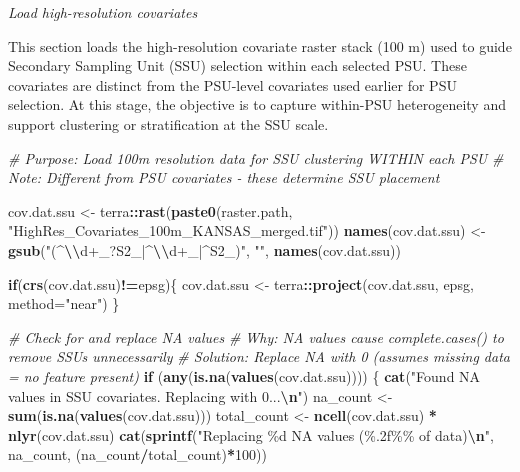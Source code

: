 \documentclass[
  10pt,
  b5paper,
  oneside]{book}
\newenvironment{Shaded}{\begin{snugshade}}{\end{snugshade}}
\newcommand{\AttributeTok}[1]{\textcolor[rgb]{0.13,0.29,0.53}{#1}}
\newcommand{\CommentTok}[1]{\textcolor[rgb]{0.56,0.35,0.01}{\textit{#1}}}
\newcommand{\ControlFlowTok}[1]{\textcolor[rgb]{0.13,0.29,0.53}{\textbf{#1}}}
\newcommand{\DecValTok}[1]{\textcolor[rgb]{0.00,0.00,0.81}{#1}}
\newcommand{\FunctionTok}[1]{\textcolor[rgb]{0.13,0.29,0.53}{\textbf{#1}}}
\newcommand{\NormalTok}[1]{#1}
\newcommand{\OtherTok}[1]{\textcolor[rgb]{0.56,0.35,0.01}{#1}}
\newcommand{\SpecialCharTok}[1]{\textcolor[rgb]{0.81,0.36,0.00}{\textbf{#1}}}
\newcommand{\StringTok}[1]{\textcolor[rgb]{0.31,0.60,0.02}{#1}}
\begin{document}
\emph{Load high-resolution covariates}

This section loads the high-resolution covariate raster stack (100 m) used to guide Secondary Sampling Unit (SSU) selection within each selected PSU. These covariates are distinct from the PSU-level covariates used earlier for PSU selection. At this stage, the objective is to capture within-PSU heterogeneity and support clustering or stratification at the SSU scale.

\begin{Shaded}
\begin{Highlighting}[]
\CommentTok{\# Purpose: Load 100m resolution data for SSU clustering WITHIN each PSU}
\CommentTok{\# Note: Different from PSU covariates {-} these determine SSU placement}

\NormalTok{cov.dat.ssu }\OtherTok{\textless{}{-}}\NormalTok{ terra}\SpecialCharTok{::}\FunctionTok{rast}\NormalTok{(}\FunctionTok{paste0}\NormalTok{(raster.path, }\StringTok{"HighRes\_Covariates\_100m\_KANSAS\_merged.tif"}\NormalTok{))}
\FunctionTok{names}\NormalTok{(cov.dat.ssu) }\OtherTok{\textless{}{-}} \FunctionTok{gsub}\NormalTok{(}\StringTok{"(\^{}}\SpecialCharTok{\textbackslash{}\textbackslash{}}\StringTok{d+\_?S2\_|\^{}}\SpecialCharTok{\textbackslash{}\textbackslash{}}\StringTok{d+\_|\^{}S2\_)"}\NormalTok{, }\StringTok{""}\NormalTok{, }\FunctionTok{names}\NormalTok{(cov.dat.ssu))}

\ControlFlowTok{if}\NormalTok{(}\FunctionTok{crs}\NormalTok{(cov.dat.ssu)}\SpecialCharTok{!=}\NormalTok{epsg)\{}
\NormalTok{  cov.dat.ssu }\OtherTok{\textless{}{-}}\NormalTok{ terra}\SpecialCharTok{::}\FunctionTok{project}\NormalTok{(cov.dat.ssu, epsg, }\AttributeTok{method=}\StringTok{"near"}\NormalTok{)}
\NormalTok{\}}

\CommentTok{\# Check for and replace NA values}
\CommentTok{\# Why: NA values cause complete.cases() to remove SSUs unnecessarily}
\CommentTok{\# Solution: Replace NA with 0 (assumes missing data = no feature present)}
\ControlFlowTok{if}\NormalTok{ (}\FunctionTok{any}\NormalTok{(}\FunctionTok{is.na}\NormalTok{(}\FunctionTok{values}\NormalTok{(cov.dat.ssu)))) \{}
  \FunctionTok{cat}\NormalTok{(}\StringTok{"Found NA values in SSU covariates. Replacing with 0...}\SpecialCharTok{\textbackslash{}n}\StringTok{"}\NormalTok{)}
\NormalTok{  na\_count }\OtherTok{\textless{}{-}} \FunctionTok{sum}\NormalTok{(}\FunctionTok{is.na}\NormalTok{(}\FunctionTok{values}\NormalTok{(cov.dat.ssu)))}
\NormalTok{  total\_count }\OtherTok{\textless{}{-}} \FunctionTok{ncell}\NormalTok{(cov.dat.ssu) }\SpecialCharTok{*} \FunctionTok{nlyr}\NormalTok{(cov.dat.ssu)}
  \FunctionTok{cat}\NormalTok{(}\FunctionTok{sprintf}\NormalTok{(}\StringTok{"Replacing \%d NA values (\%.2f\%\% of data)}\SpecialCharTok{\textbackslash{}n}\StringTok{"}\NormalTok{, }
\NormalTok{              na\_count, (na\_count}\SpecialCharTok{/}\NormalTok{total\_count)}\SpecialCharTok{*}\DecValTok{100}\NormalTok{))}
  

\end{Highlighting}
\end{Shaded}
\end{document}
